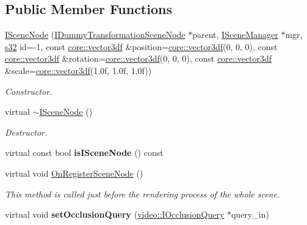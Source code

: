 \subsection*{Public Member Functions}
\begin{DoxyCompactItemize}
\item 
\hyperlink{classirr_1_1scene_1_1ISceneNode_a9e49a6113057f0e89cbdad6646a1fc14}{I\+Scene\+Node} (\hyperlink{classirr_1_1scene_1_1IDummyTransformationSceneNode}{I\+Dummy\+Transformation\+Scene\+Node} $\ast$parent, \hyperlink{classirr_1_1scene_1_1ISceneManager}{I\+Scene\+Manager} $\ast$mgr, \hyperlink{namespaceirr_ac66849b7a6ed16e30ebede579f9b47c6}{s32} id=-\/1, const \hyperlink{namespaceirr_1_1core_a06f169d08b5c429f5575acb7edbad811}{core\+::vector3df} \&position=\hyperlink{namespaceirr_1_1core_a06f169d08b5c429f5575acb7edbad811}{core\+::vector3df}(0, 0, 0), const \hyperlink{namespaceirr_1_1core_a06f169d08b5c429f5575acb7edbad811}{core\+::vector3df} \&rotation=\hyperlink{namespaceirr_1_1core_a06f169d08b5c429f5575acb7edbad811}{core\+::vector3df}(0, 0, 0), const \hyperlink{namespaceirr_1_1core_a06f169d08b5c429f5575acb7edbad811}{core\+::vector3df} \&scale=\hyperlink{namespaceirr_1_1core_a06f169d08b5c429f5575acb7edbad811}{core\+::vector3df}(1.\+0f, 1.\+0f, 1.\+0f))\hypertarget{classirr_1_1scene_1_1ISceneNode_a9e49a6113057f0e89cbdad6646a1fc14}{}\label{classirr_1_1scene_1_1ISceneNode_a9e49a6113057f0e89cbdad6646a1fc14}

\begin{DoxyCompactList}\small\item\em Constructor. \end{DoxyCompactList}\item 
virtual \hyperlink{classirr_1_1scene_1_1ISceneNode_a3064ed436d731f072e55873577724fbc}{$\sim$\+I\+Scene\+Node} ()\hypertarget{classirr_1_1scene_1_1ISceneNode_a3064ed436d731f072e55873577724fbc}{}\label{classirr_1_1scene_1_1ISceneNode_a3064ed436d731f072e55873577724fbc}

\begin{DoxyCompactList}\small\item\em Destructor. \end{DoxyCompactList}\item 
virtual const bool {\bfseries is\+I\+Scene\+Node} () const \hypertarget{classirr_1_1scene_1_1ISceneNode_af1b1521916e7cd391e0571dd5da0d151}{}\label{classirr_1_1scene_1_1ISceneNode_af1b1521916e7cd391e0571dd5da0d151}

\item 
virtual void \hyperlink{classirr_1_1scene_1_1ISceneNode_ac9795bfcb88dcaf8cba6ea3296e5d8d0}{On\+Register\+Scene\+Node} ()
\begin{DoxyCompactList}\small\item\em This method is called just before the rendering process of the whole scene. \end{DoxyCompactList}\item 
virtual void {\bfseries set\+Occlusion\+Query} (\hyperlink{classirr_1_1video_1_1IOcclusionQuery}{video\+::\+I\+Occlusion\+Query} $\ast$query\+\_\+in)\hypertarget{classirr_1_1scene_1_1ISceneNode_a9e6ad639973bd46fb563a0e9fa492e3e}{}\label{classirr_1_1scene_1_1ISceneNode_a9e6ad639973bd46fb563a0e9fa492e3e}


\end{DoxyCompactItemize}
